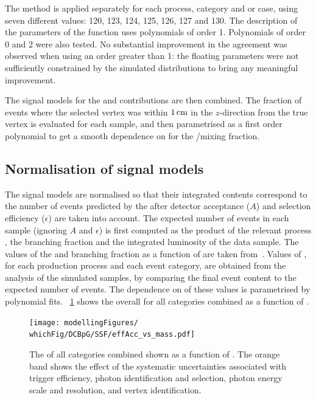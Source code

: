 The \SSF method is applied separately for each process, category and \RV or \WV case, using seven different \mH values: 120, 123, 124, 125, 126, 127 and 130\GeV. The description of the parameters of the \DCBpG function uses polynomials of order 1. Polynomials of order 0 and 2 were also tested. No substantial improvement in the agreement was observed when using an order greater than 1: the floating parameters were not sufficiently constrained by the simulated \mgg distributions to bring any meaningful improvement.

The signal models for the \RV and \WV contributions are then combined. %
The fraction of events where the selected vertex was within $1\,\text{cm}$ in the $z$-direction from the true vertex is evaluated for each \mH sample, and then parametrised as a first order polynomial to get a smooth dependence on \mH for the \RV/\WV mixing fraction. 


\subsection{Normalisation of signal models}

The signal models are normalised so that their integrated contents correspond to the number of events predicted by the \SM after detector acceptance ($A$) and selection efficiency ($\epsilon$) are taken into account. The expected number of events in each sample (ignoring $A$ and $\epsilon$) is first computed as the product of the relevant process \crosssection, the \Hgg branching fraction and the integrated luminosity of the data sample. The values of the \crosssection\s and branching fraction as a function of \mH are taken from~\cite{LHCHXSWGYR4}. 
Values of \effxacc, for each production process and each event category, are obtained from the analysis of the simulated samples, by comparing the final event content to the expected number of events.
The dependence on \mH of these values is parametrised by polynomial fits.
\Fig~\ref{fig:model:sig_effxacc} shows the overall \effxacc for all categories combined as a function of \mH.

\begin{figure}[ht!]
\centering
\texttt{[image: modellingFigures/\\whichFig/DCBpG/SSF/effAcc\_vs\_mass.pdf]} 
\caption{The \effxacc of all categories combined shown as a function of \mH. The orange band shows the effect of the systematic uncertainties associated with trigger efficiency, photon identification and selection, photon energy scale and resolution, and vertex identification.}

\label{fig:model:sig_effxacc}
\end{figure}

